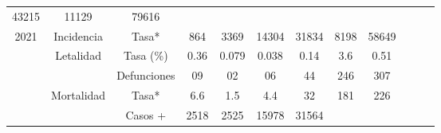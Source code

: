 \begin{tabular}{ccc|cccccc|lll}
		\multicolumn{1}{c|}{\cellcolor[HTML]{FFFC9E}43215} &
		\multicolumn{1}{c|}{\cellcolor[HTML]{FFFC9E}11129} &
		\cellcolor[HTML]{FFFC9E}79616 &
		&
		&
		\\ \cline{2-9}
		\multicolumn{1}{|c|}{\multirow{-5}{*}{\cellcolor[HTML]{FFFC9E}2021}} &
		\multicolumn{1}{c|}{\cellcolor[HTML]{FFFC9E}Incidencia} &
		\cellcolor[HTML]{FFFC9E}Tasa* &
		\multicolumn{1}{c|}{\cellcolor[HTML]{FFFC9E}864} &
		\multicolumn{1}{c|}{\cellcolor[HTML]{FFFC9E}3369} &
		\multicolumn{1}{c|}{\cellcolor[HTML]{FFFC9E}14304} &
		\multicolumn{1}{c|}{\cellcolor[HTML]{FFFC9E}31834} &
		\multicolumn{1}{c|}{\cellcolor[HTML]{FFFC9E}8198} &
		\cellcolor[HTML]{FFFC9E}58649 &
		&
		&
		\\ \cline{1-9}
		\multicolumn{1}{|c|}{\cellcolor[HTML]{C1EFC0}} &
		\multicolumn{1}{c|}{\cellcolor[HTML]{C1EFC0}Letalidad} &
		\cellcolor[HTML]{C1EFC0}Tasa (\%) &
		\multicolumn{1}{c|}{\cellcolor[HTML]{C1EFC0}0.36} &
		\multicolumn{1}{c|}{\cellcolor[HTML]{C1EFC0}0.079} &
		\multicolumn{1}{c|}{\cellcolor[HTML]{C1EFC0}0.038} &
		\multicolumn{1}{c|}{\cellcolor[HTML]{C1EFC0}0.14} &
		\multicolumn{1}{c|}{\cellcolor[HTML]{C1EFC0}3.6} &
		\cellcolor[HTML]{C1EFC0}0.51 &
		&
		&
		\\ \cline{3-9}
		\multicolumn{1}{|c|}{\cellcolor[HTML]{C1EFC0}} &
		\multicolumn{1}{c|}{\cellcolor[HTML]{C1EFC0}} &
		\cellcolor[HTML]{C1EFC0}Defunciones &
		\multicolumn{1}{c|}{\cellcolor[HTML]{C1EFC0}09} &
		\multicolumn{1}{c|}{\cellcolor[HTML]{C1EFC0}02} &
		\multicolumn{1}{c|}{\cellcolor[HTML]{C1EFC0}06} &
		\multicolumn{1}{c|}{\cellcolor[HTML]{C1EFC0}44} &
		\multicolumn{1}{c|}{\cellcolor[HTML]{C1EFC0}246} &
		\cellcolor[HTML]{C1EFC0}307 &
		&
		&
		\\ \cline{3-9}
		\multicolumn{1}{|c|}{\cellcolor[HTML]{C1EFC0}} &
		\multicolumn{1}{c|}{\cellcolor[HTML]{C1EFC0}Mortalidad} &
		\cellcolor[HTML]{C1EFC0}Tasa* &
		\multicolumn{1}{c|}{\cellcolor[HTML]{C1EFC0}6.6} &
		\multicolumn{1}{c|}{\cellcolor[HTML]{C1EFC0}1.5} &
		\multicolumn{1}{c|}{\cellcolor[HTML]{C1EFC0}4.4} &
		\multicolumn{1}{c|}{\cellcolor[HTML]{C1EFC0}32} &
		\multicolumn{1}{c|}{\cellcolor[HTML]{C1EFC0}181} &
		\cellcolor[HTML]{C1EFC0}226 &
		&
		&
		\\ \cline{3-9}
		\multicolumn{1}{|c|}{\cellcolor[HTML]{C1EFC0}} &
		\multicolumn{1}{c|}{\cellcolor[HTML]{C1EFC0}} &
		\cellcolor[HTML]{C1EFC0}Casos + &
		\multicolumn{1}{c|}{\cellcolor[HTML]{C1EFC0}2518} &
		\multicolumn{1}{c|}{\cellcolor[HTML]{C1EFC0}2525} &
		\multicolumn{1}{c|}{\cellcolor[HTML]{C1EFC0}15978} &
		\multicolumn{1}{c|}{\cellcolor[HTML]{C1EFC0}31564} &

\end{tabular}
